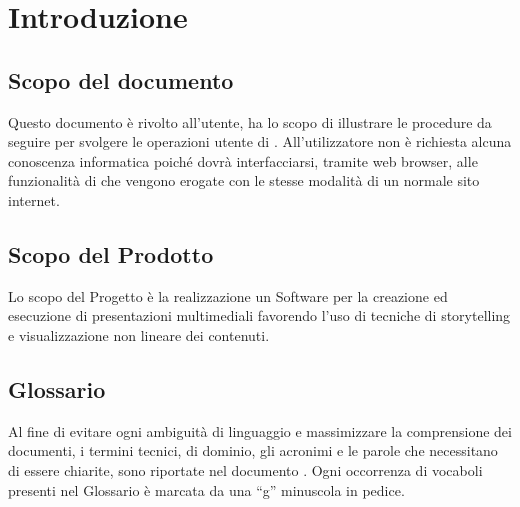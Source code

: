 \section{Introduzione}
\subsection{Scopo del documento}
Questo documento è rivolto all’utente, ha lo scopo di illustrare le procedure da seguire per svolgere le operazioni utente di \premi . All'utilizzatore non è richiesta alcuna conoscenza informatica poiché dovrà interfacciarsi, tramite web browser, alle funzionalità di \premi che vengono erogate con le stesse modalità di un normale sito internet.
\subsection{Scopo del Prodotto}
Lo scopo del Progetto è la realizzazione un Software per la creazione ed esecuzione di presentazioni multimediali favorendo l’uso di tecniche di storytelling e visualizzazione non lineare dei contenuti.
\subsection{Glossario}
Al fine di evitare ogni ambiguità di linguaggio e massimizzare la comprensione dei documenti, i termini tecnici, di dominio, gli acronimi e le parole che necessitano di essere chiarite, sono riportate nel documento \href{run:../../Esterni/\fGlossario}{\fEscapeGlossario}. Ogni occorrenza di vocaboli presenti nel Glossario è marcata da una “g” minuscola in pedice.



